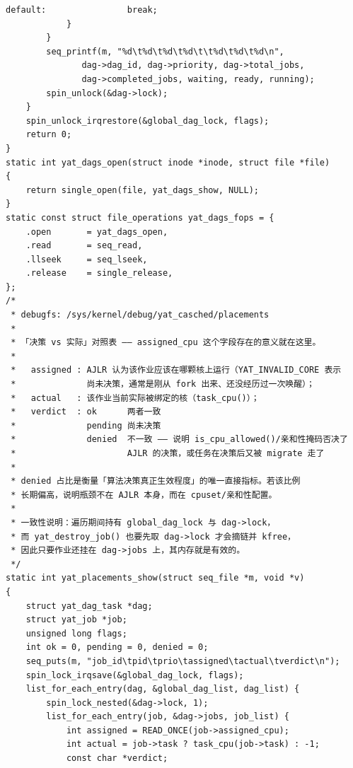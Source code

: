 \documentclass[10pt,a4paper]{article}
\newenvironment{yatpage}{\vspace*{0pt}}{\par}
\begin{document}
\begin{yatpage}
\begin{Verbatim}[fontsize=\fontsize{8.2}{9.8}\selectfont]
			default:				break;
			}
		}
		seq_printf(m, "%d\t%d\t%d\t%d\t\t%d\t%d\t%d\n",
			   dag->dag_id, dag->priority, dag->total_jobs,
			   dag->completed_jobs, waiting, ready, running);
		spin_unlock(&dag->lock);
	}
	spin_unlock_irqrestore(&global_dag_lock, flags);
	return 0;
}
static int yat_dags_open(struct inode *inode, struct file *file)
{
	return single_open(file, yat_dags_show, NULL);
}
static const struct file_operations yat_dags_fops = {
	.open		= yat_dags_open,
	.read		= seq_read,
	.llseek		= seq_lseek,
	.release	= single_release,
};
/*
 * debugfs: /sys/kernel/debug/yat_casched/placements
 *
 * 「决策 vs 实际」对照表 —— assigned_cpu 这个字段存在的意义就在这里。
 *
 *   assigned : AJLR 认为该作业应该在哪颗核上运行（YAT_INVALID_CORE 表示
 *              尚未决策，通常是刚从 fork 出来、还没经历过一次唤醒）；
 *   actual   : 该作业当前实际被绑定的核（task_cpu()）；
 *   verdict  : ok      两者一致
 *              pending 尚未决策
 *              denied  不一致 —— 说明 is_cpu_allowed()/亲和性掩码否决了
 *                      AJLR 的决策，或任务在决策后又被 migrate 走了
 *
 * denied 占比是衡量「算法决策真正生效程度」的唯一直接指标。若该比例
 * 长期偏高，说明瓶颈不在 AJLR 本身，而在 cpuset/亲和性配置。
 *
 * 一致性说明：遍历期间持有 global_dag_lock 与 dag->lock，
 * 而 yat_destroy_job() 也要先取 dag->lock 才会摘链并 kfree，
 * 因此只要作业还挂在 dag->jobs 上，其内存就是有效的。
 */
static int yat_placements_show(struct seq_file *m, void *v)
{
	struct yat_dag_task *dag;
	struct yat_job *job;
	unsigned long flags;
	int ok = 0, pending = 0, denied = 0;
	seq_puts(m, "job_id\tpid\tprio\tassigned\tactual\tverdict\n");
	spin_lock_irqsave(&global_dag_lock, flags);
	list_for_each_entry(dag, &global_dag_list, dag_list) {
		spin_lock_nested(&dag->lock, 1);
		list_for_each_entry(job, &dag->jobs, job_list) {
			int assigned = READ_ONCE(job->assigned_cpu);
			int actual = job->task ? task_cpu(job->task) : -1;
			const char *verdict;
\end{Verbatim}
\end{yatpage}
\newpage
\end{document}
